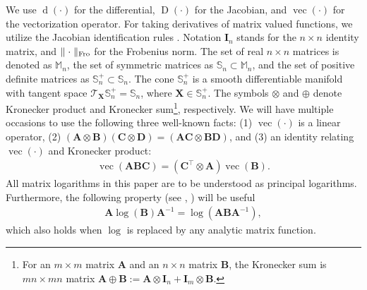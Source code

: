 \documentclass[letterpaper,10pt,twocolumn,conference]{ieeeconf}
\newcommand{\bbA}{\bm{A}}
\newcommand{\bbB}{\bm{B}}
\newcommand{\bbC}{\bm{C}}
\newcommand{\bbD}{\bm{D}}
\newcommand{\bbI}{\bm{I}}
\newcommand{\bbX}{\bm{X}}
\newcommand{\Jacobian}{\operatorname{D}}
\newcommand{\differential}{\operatorname{d}}
\renewcommand{\vec}{\operatorname{vec}}
\begin{document}
We use $\differential(\cdot)$ for the differential, $\Jacobian(\cdot)$ for the Jacobian, and $\vec(\cdot)$ for the vectorization operator. For taking derivatives of matrix valued functions, we utilize the Jacobian identification rules \cite[p. 199, Table 2]{MagnusNeudecker}. Notation $\bbI_{n}$ stands for the $n\times n$ identity matrix, and $\parallel \cdot \parallel_{{\rm{Fro}}}$ for the Frobenius norm. The set of real $n\times n$ matrices is denoted as $\mathbb{M}_{n}$, the set of symmetric matrices as $\mathbb{S}_{n}\subset\mathbb{M}_{n}$, and the set of positive definite matrices as $\mathbb{S}_{n}^{+}\subset\mathbb{S}_{n}$. The cone $\mathbb{S}_{n}^{+}$ is a smooth differentiable manifold with tangent space $\mathcal{T}_{\bbX}\mathbb{S}_{n}^{+} = \mathbb{S}_{n}$, where $\bbX \in \mathbb{S}_{n}^{+}$. The symbols $\otimes$ and $\oplus$ denote Kronecker product and Kronecker sum\footnote{For an $m\times m$ matrix $\bbA$ and an $n\times n$ matrix $\bbB$, the Kronecker sum is $mn\times mn$ matrix $\bbA\oplus\bbB := \bbA \otimes \bbI_{n} + \bbI_{m} \otimes \bbB$.}, respectively. We will have multiple occasions to use the following three well-known facts: (1) $\vec(\cdot)$ is a linear operator, (2) $(\bbA\otimes\bbB)(\bbC\otimes\bbD) = (\bbA\bbC\otimes\bbB\bbD)$, and (3) an identity relating $\vec(\cdot)$ and Kronecker product:
\begin{eqnarray}
\vec(\bbA\bbB\bbC) = \left(\bbC^{\top}\otimes\bbA\right)\vec(\bbB).
\label{veckronprodidentity}	
\end{eqnarray}
All matrix logarithms in this paper are to be understood as principal logarithms. Furthermore, the following property (see \cite{CurtisBook}, \cite[Theorem 1.13(c)]{HighamBook}) will be useful
\begin{eqnarray}
	\bbA\log(\bbB)\bbA^{-1} = \log\left(\bbA\bbB\bbA^{-1}\right),
	\label{LogProd}
\end{eqnarray}
which also holds when $\log$ is replaced by any analytic matrix function. 


\end{document}

